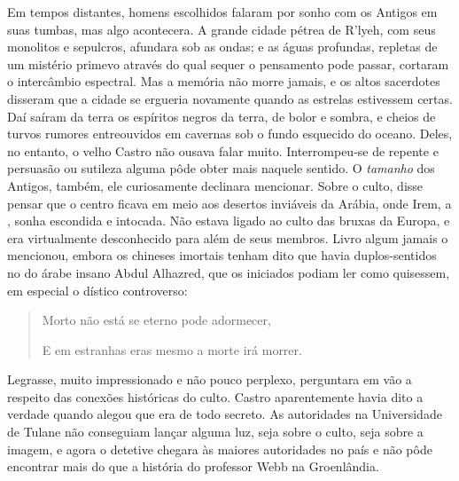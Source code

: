 \begin{pages}
\begin{Rightside}
Em tempos distantes, homens escolhidos falaram por sonho com os Antigos
em suas tumbas, mas algo acontecera. A grande cidade pétrea de R'lyeh,
com seus monolitos e sepulcros, afundara sob as ondas; e as águas
profundas, repletas de um mistério primevo através do qual sequer o
pensamento pode passar, cortaram o intercâmbio espectral. Mas a memória
não morre jamais, e os altos sacerdotes disseram que a cidade se
ergueria novamente quando as estrelas estivessem certas. Daí saíram da
terra os espíritos negros da terra, de bolor e sombra, e cheios de
turvos rumores entreouvidos em cavernas sob o fundo esquecido do oceano.
Deles, no entanto, o velho Castro não ousava falar muito. Interrompeu-se
de repente e persuasão ou sutileza alguma pôde obter mais naquele
sentido. O \emph{tamanho} dos Antigos, também, ele curiosamente
declinara mencionar. Sobre o culto, disse pensar que o centro ficava em
meio aos desertos inviáveis da Arábia, onde Irem, a , sonha escondida e
intocada. Não estava ligado ao culto das bruxas da Europa, e era
virtualmente desconhecido para além de seus membros. Livro algum jamais
o mencionou, embora os chineses imortais tenham dito que havia
duplos-sentidos no  do árabe insano Abdul Alhazred, que os iniciados podiam ler
como quisessem, em especial o dístico controverso:

\begin{quote}
\forceindent{}Morto não está se eterno pode adormecer,

E em estranhas eras mesmo a morte irá morrer.
\end{quote}

Legrasse, muito impressionado e não pouco perplexo, perguntara em vão a
respeito das conexões históricas do culto. Castro aparentemente havia
dito a verdade quando alegou que era de todo secreto. As autoridades na
Universidade de Tulane não conseguiam lançar alguma luz, seja sobre o
culto, seja sobre a imagem, e agora o detetive chegara às maiores
autoridades no país e não pôde encontrar mais do que a história do
professor Webb na Groenlândia.


\end{Rightside}
\end{pages}
